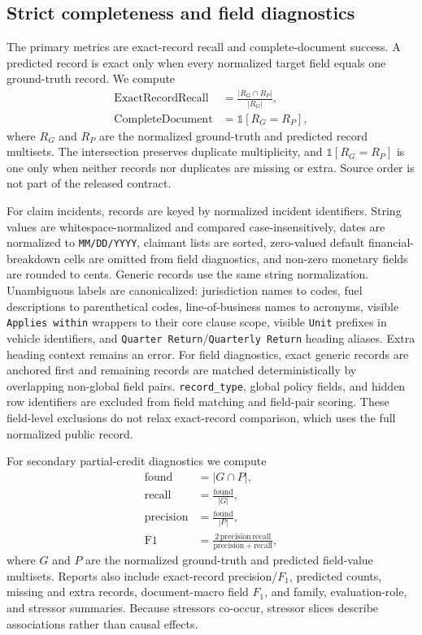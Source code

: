 \subsection{Strict completeness and field diagnostics}
The primary metrics are exact-record recall and complete-document success. A predicted record is exact only when every normalized target field equals one ground-truth record. We compute
\begin{align}
\mathrm{ExactRecordRecall} &= \frac{|R_G \cap R_P|}{|R_G|},\\
\mathrm{CompleteDocument} &= \mathds{1}[R_G = R_P],
\end{align}
where $R_G$ and $R_P$ are the normalized ground-truth and predicted record multisets. The intersection preserves duplicate multiplicity, and $\mathds{1}[R_G=R_P]$ is one only when neither records nor duplicates are missing or extra. Source order is not part of the released contract.

For claim incidents, records are keyed by normalized incident identifiers. String values are whitespace-normalized and compared case-insensitively, dates are normalized to \texttt{MM/DD/YYYY}, claimant lists are sorted, zero-valued default financial-breakdown cells are omitted from field diagnostics, and non-zero monetary fields are rounded to cents. Generic records use the same string normalization. Unambiguous labels are canonicalized: jurisdiction names to codes, fuel descriptions to parenthetical codes, line-of-business names to acronyms, visible \texttt{Applies within} wrappers to their core clause scope, visible \texttt{Unit} prefixes in vehicle identifiers, and \texttt{Quarter Return}/\texttt{Quarterly Return} heading aliases. Extra heading context remains an error. For field diagnostics, exact generic records are anchored first and remaining records are matched deterministically by overlapping non-global field pairs. \texttt{record\_type}, global policy fields, and hidden row identifiers are excluded from field matching and field-pair scoring. These field-level exclusions do not relax exact-record comparison, which uses the full normalized public record.

For secondary partial-credit diagnostics we compute
\begin{align}
\mathrm{found} &= |G \cap P|,\\
\mathrm{recall} &= \frac{\mathrm{found}}{|G|},\\
\mathrm{precision} &= \frac{\mathrm{found}}{|P|},\\
\mathrm{F1} &= \frac{2\,\mathrm{precision}\,\mathrm{recall}}{\mathrm{precision}+\mathrm{recall}},
\end{align}
where $G$ and $P$ are the normalized ground-truth and predicted field-value multisets. Reports also include exact-record precision/$F_1$, predicted counts, missing and extra records, document-macro field $F_1$, and family, evaluation-role, and stressor summaries. Because stressors co-occur, stressor slices describe associations rather than causal effects.
